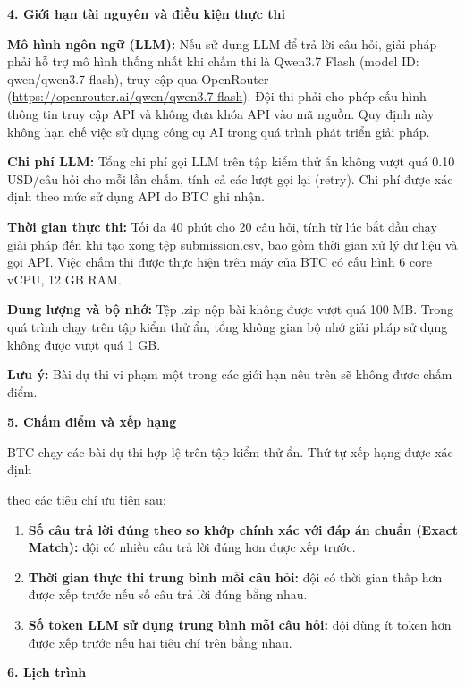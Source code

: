 \documentclass[12pt,a4paper]{article}
\begin{document}
\textbf{4. Giới hạn tài nguyên và điều kiện thực thi}

\textbf{Mô hình ngôn ngữ (LLM):} Nếu sử dụng LLM để trả lời câu hỏi, giải pháp phải hỗ trợ mô hình thống nhất khi chấm thi là Qwen3.7 Flash (model ID: qwen/qwen3.7-flash), truy cập qua OpenRouter (\href{https://openrouter.ai/qwen/qwen3.7-flash}{https://openrouter.ai/qwen/qwen3.7-flash}). Đội thi phải cho phép cấu hình thông tin truy cập API và không đưa khóa API vào mã nguồn. Quy định này không hạn chế việc sử dụng công cụ AI trong quá trình phát triển giải pháp.

\textbf{Chi phí LLM:} Tổng chi phí gọi LLM trên tập kiểm thử ẩn không vượt quá 0.10 USD/câu hỏi cho mỗi lần chấm, tính cả các lượt gọi lại (retry). Chi phí được xác định theo mức sử dụng API do BTC ghi nhận.

\textbf{Thời gian thực thi:} Tối đa 40 phút cho 20 câu hỏi, tính từ lúc bắt đầu chạy giải pháp đến khi tạo xong tệp submission.csv, bao gồm thời gian xử lý dữ liệu và gọi API. Việc chấm thi được thực hiện trên máy của BTC có cấu hình 6 core vCPU, 12 GB RAM.

\textbf{Dung lượng và bộ nhớ:} Tệp .zip nộp bài không được vượt quá 100 MB. Trong quá trình chạy trên tập kiểm thử ẩn, tổng không gian bộ nhớ giải pháp sử dụng không được vượt quá 1 GB.

\textbf{Lưu ý:} Bài dự thi vi phạm một trong các giới hạn nêu trên sẽ không được chấm điểm.

\textbf{5. Chấm điểm và xếp hạng}

BTC chạy các bài dự thi hợp lệ trên tập kiểm thử ẩn. Thứ tự xếp hạng được xác định

\newpage

theo các tiêu chí ưu tiên sau:

\begin{enumerate}[leftmargin=1.5em, itemsep=3pt, topsep=2pt, label=\textbf{\arabic*)}]
    \item \textbf{Số câu trả lời đúng theo so khớp chính xác với đáp án chuẩn (Exact Match):} đội có nhiều câu trả lời đúng hơn được xếp trước.
    \item \textbf{Thời gian thực thi trung bình mỗi câu hỏi:} đội có thời gian thấp hơn được xếp trước nếu số câu trả lời đúng bằng nhau.
    \item \textbf{Số token LLM sử dụng trung bình mỗi câu hỏi:} đội dùng ít token hơn được xếp trước nếu hai tiêu chí trên bằng nhau.
\end{enumerate}

\textbf{6. Lịch trình}
\end{document}
